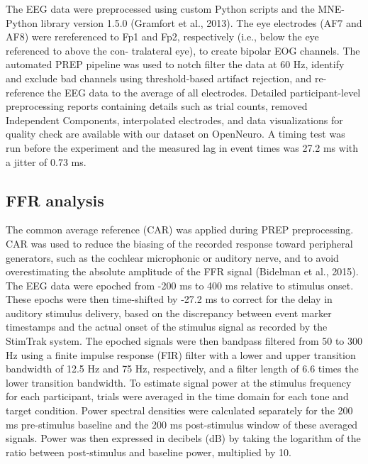 \documentclass{article}
\begin{document}
The EEG data were preprocessed using custom Python scripts and the MNE-Python library version 1.5.0 (Gramfort et al., 2013). The eye electrodes (AF7 and AF8) were rereferenced to Fp1 and Fp2, respectively (i.e., below the eye referenced to above the con- tralateral eye), to create bipolar EOG channels. The automated PREP pipeline was used to notch filter the data at 60 Hz, identify and exclude bad channels using threshold-based artifact rejection, and re-reference the EEG data to the average of all electrodes. Detailed participant-level preprocessing reports containing details such as trial counts, removed Independent Components, interpolated electrodes, and data visualizations for quality check are available with our dataset on OpenNeuro. A timing test was run before the experiment and the measured lag in event times was 27.2 ms with a jitter of 0.73 ms.
					
\subsection*{FFR analysis}
					
The common average reference (CAR) was applied during PREP preprocessing. CAR was used to reduce the biasing of the recorded response toward peripheral generators, such as the cochlear microphonic or auditory nerve, and to avoid overestimating the absolute amplitude of the FFR signal (Bidelman et al., 2015). The EEG data were epoched from -200 ms to 400 ms relative to stimulus onset. These epochs were then time-shifted by -27.2 ms to correct for the delay in auditory stimulus delivery, based on the discrepancy between event marker timestamps and the actual onset of the stimulus signal as recorded by the StimTrak system. The epoched signals were then bandpass filtered from 50 to 300 Hz using a finite impulse response (FIR) filter with a lower and upper transition bandwidth of 12.5 Hz and 75 Hz, respectively, and a filter length of 6.6 times the lower transition bandwidth. To estimate signal power at the stimulus frequency for each participant, trials were averaged in the time domain for each tone and target condition. Power spectral densities were calculated separately for the 200 ms pre-stimulus baseline and the 200 ms post-stimulus window of these averaged signals. Power was then expressed in decibels (dB) by taking the logarithm of the ratio between post-stimulus and baseline power, multiplied by 10.
\end{document}
